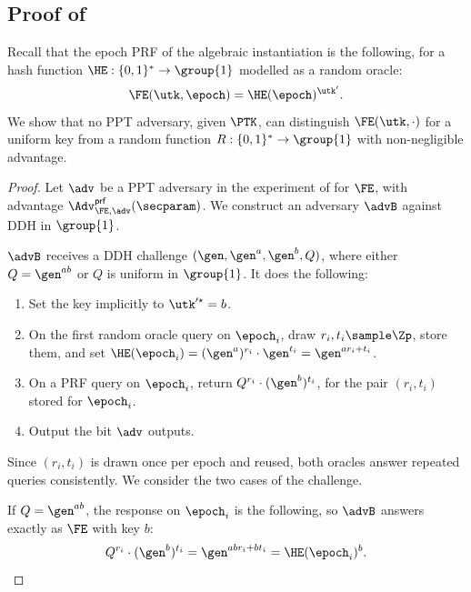 \subsection{Proof of }

Recall that the epoch PRF of the algebraic instantiation is the following, for
a hash function $\HE : \{0,1\}^* \to \group{1}$ modelled as a random oracle:
%
\begin{equation*}
  \FE(\utk, \epoch) = \HE(\epoch)^{\utk'}.
\end{equation*}
%
We show that no PPT adversary, given $\PTK$, can distinguish $\FE(\utk, \cdot)$
for a uniform key from a random function $R : \{0,1\}^* \to \group{1}$ with
non-negligible advantage.

\begin{proof}

  Let $\adv$ be a PPT adversary in the experiment of  for $\FE$,
with advantage $\Adv^{\mathsf{prf}}_{\FE,\adv}(\secparam)$. We construct an
adversary $\advB$ against DDH in $\group{1}$.

  $\advB$ receives a DDH challenge $(\gen, \gen^a, \gen^b, Q)$, where either $Q =
\gen^{ab}$ or $Q$ is uniform in $\group{1}$. It does the following:

  \begin{enumerate}

    \item Set the key implicitly to $\utk'^\star = b$.

    \item On the first random oracle query on $\epoch_i$, draw $r_i, t_i \sample
\Zp$, store them, and set $\HE(\epoch_{i}) = (\gen^a)^{r_i}\cdot\gen^{t_i} =
\gen^{a r_i + t_i}$.

    \item On a PRF query on $\epoch_i$, return $Q^{r_i}\cdot(\gen^{b})^{t_i}$,
for the pair $(r_i, t_i)$ stored for $\epoch_i$.

    \item Output the bit $\adv$ outputs.

  \end{enumerate}

  Since $(r_i, t_i)$ is drawn once per epoch and reused, both oracles answer
repeated queries consistently. We consider the two cases of the challenge.

  If $Q = \gen^{ab}$, the response on $\epoch_i$ is the following, so $\advB$
answers exactly as $\FE$ with key $b$:
  \begin{equation*}
    Q^{r_i}\cdot(\gen^{b})^{t_i} = \gen^{a b r_i + b t_i} = \HE(\epoch_i)^{b}.
  \end{equation*}


\end{proof}
